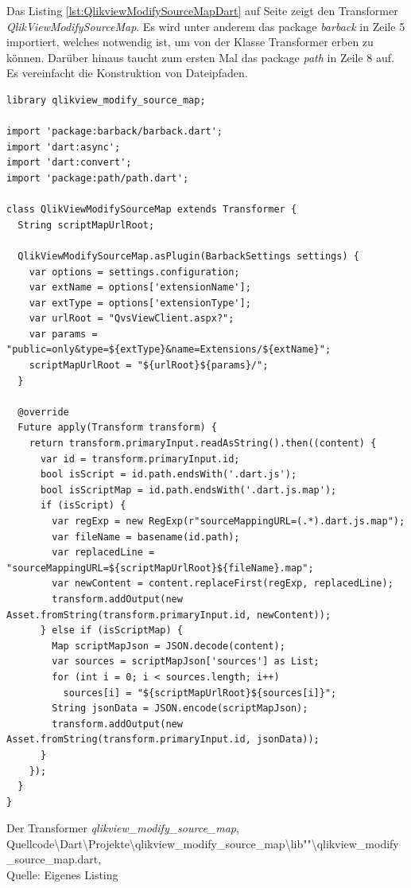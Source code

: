 Das Listing \ref{lst:QlikviewModifySourceMapDart} auf Seite \pageref{lst:QlikviewModifySourceMapDart} zeigt den Transformer \textit{QlikViewModifySourceMap}. Es wird unter anderem das package \textit{barback} in Zeile 5 importiert, welches notwendig ist, um von der Klasse Transformer erben zu können. Darüber hinaus taucht zum ersten Mal das package \textit{path} in Zeile 8 auf. Es vereinfacht die Konstruktion von Dateipfaden.

\begin{listing}[htbp]
\begin{verbatim}
library qlikview_modify_source_map;

import 'package:barback/barback.dart';
import 'dart:async';
import 'dart:convert';
import 'package:path/path.dart';

class QlikViewModifySourceMap extends Transformer {
  String scriptMapUrlRoot;

  QlikViewModifySourceMap.asPlugin(BarbackSettings settings) {
    var options = settings.configuration;
    var extName = options['extensionName'];
    var extType = options['extensionType'];
    var urlRoot = "QvsViewClient.aspx?";
    var params = "public=only&type=${extType}&name=Extensions/${extName}";
    scriptMapUrlRoot = "${urlRoot}${params}/";
  }

  @override
  Future apply(Transform transform) {
    return transform.primaryInput.readAsString().then((content) {
      var id = transform.primaryInput.id;      
      bool isScript = id.path.endsWith('.dart.js');
      bool isScriptMap = id.path.endsWith('.dart.js.map');
      if (isScript) {
        var regExp = new RegExp(r"sourceMappingURL=(.*).dart.js.map");
        var fileName = basename(id.path);
        var replacedLine = "sourceMappingURL=${scriptMapUrlRoot}${fileName}.map";
        var newContent = content.replaceFirst(regExp, replacedLine);
        transform.addOutput(new Asset.fromString(transform.primaryInput.id, newContent));
      } else if (isScriptMap) {
        Map scriptMapJson = JSON.decode(content);
        var sources = scriptMapJson['sources'] as List;
        for (int i = 0; i < sources.length; i++) 
          sources[i] = "${scriptMapUrlRoot}${sources[i]}";
        String jsonData = JSON.encode(scriptMapJson);
        transform.addOutput(new Asset.fromString(transform.primaryInput.id, jsonData));
      }
    });
  }
}
\end{verbatim}
\caption[Der Transformer \textit{qlikview\_modify\_source\_map}]{Der Transformer \textit{qlikview\_modify\_source\_map}, \\Quellcode\textbackslash{}Dart\textbackslash{}Projekte\textbackslash{}qlikview\_modify\_source\_map\textbackslash{}lib""\textbackslash{}qlikview\_modify\_source\_map.dart, \\Quelle: Eigenes Listing}
\label{lst:QlikviewModifySourceMapDart}
\end{listing}



